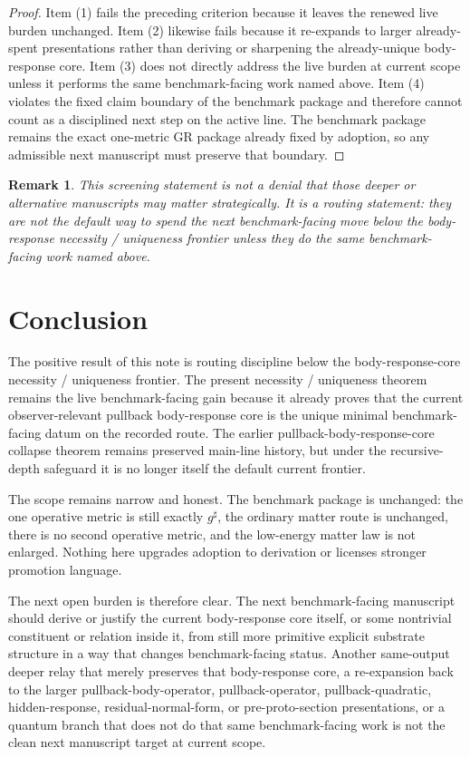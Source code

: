 \documentclass[11pt]{article}
\newcommand{\CompletedMetric}{g^{\sharp}}
\newtheorem{remark}{Remark}
\begin{document}
\begin{proof}
Item (1) fails the preceding criterion because it leaves the renewed live burden unchanged. Item (2) likewise fails because it re-expands to larger already-spent presentations rather than deriving or sharpening the already-unique body-response core. Item (3) does not directly address the live burden at current scope unless it performs the same benchmark-facing work named above. Item (4) violates the fixed claim boundary of the benchmark package and therefore cannot count as a disciplined next step on the active line. The benchmark package remains the exact one-metric GR package already fixed by adoption, so any admissible next manuscript must preserve that boundary.
\end{proof}

\begin{remark}
This screening statement is not a denial that those deeper or alternative manuscripts may matter strategically. It is a routing statement: they are not the default way to spend the next benchmark-facing move below the body-response necessity / uniqueness frontier unless they do the same benchmark-facing work named above.
\end{remark}

\section{Conclusion}

The positive result of this note is routing discipline below the body-response-core necessity / uniqueness frontier. The present necessity / uniqueness theorem remains the live benchmark-facing gain because it already proves that the current observer-relevant pullback body-response core is the unique minimal benchmark-facing datum on the recorded route. The earlier pullback-body-response-core collapse theorem remains preserved main-line history, but under the recursive-depth safeguard it is no longer itself the default current frontier.

The scope remains narrow and honest. The benchmark package is unchanged: the one operative metric is still exactly \(\CompletedMetric\), the ordinary matter route is unchanged, there is no second operative metric, and the low-energy matter law is not enlarged. Nothing here upgrades adoption to derivation or licenses stronger promotion language.

The next open burden is therefore clear. The next benchmark-facing manuscript should derive or justify the current body-response core itself, or some nontrivial constituent or relation inside it, from still more primitive explicit substrate structure in a way that changes benchmark-facing status. Another same-output deeper relay that merely preserves that body-response core, a re-expansion back to the larger pullback-body-operator, pullback-operator, pullback-quadratic, hidden-response, residual-normal-form, or pre-proto-section presentations, or a quantum branch that does not do that same benchmark-facing work is not the clean next manuscript target at current scope.
\end{document}
